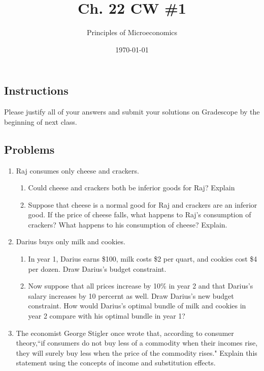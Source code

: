 \documentclass{article}
\title{Ch. 22 CW \#1}
\author{Principles of Microeconomics}
\date{\today}
\begin{document}
\maketitle

\subsection*{Instructions}

Please justify all of your answers and submit your solutions on Gradescope by the beginning of next class.

\subsection*{Problems}

\begin{enumerate}

\item Raj consumes only cheese and crackers.
	
	\begin{enumerate}
	
	\item Could cheese and crackers both be inferior goods for Raj? Explain
	
	\item Suppose that cheese is a normal good for Raj and crackers are an inferior good. If the price of cheese falls, what happens to Raj's consumption of crackers? What happens to his consumption of cheese? Explain.
	
	\end{enumerate}

\item Darius buys only milk and cookies.

	\begin{enumerate}
	
	\item In year 1, Darius earns \$100, milk costs \$2 per quart, and cookies cost \$4 per dozen. Draw Darius's budget constraint.
	
	\item Now suppose that all prices increase by 10\% in year 2 and that Darius's salary increases by 10 percernt as well. Draw Darius's new budget constraint. How would Darius's optimal bundle of milk and cookies in year 2 compare with his optimal bundle in year 1?
	
	\end{enumerate}
	
\item The economist George Stigler once wrote that, according to consumer theory,``if consumers do not buy less of a commodity when their incomes rise, they will surely buy less when the price of the commodity rises." Explain this statement using the concepts of income and substitution effects.


\end{enumerate}
\end{document}
